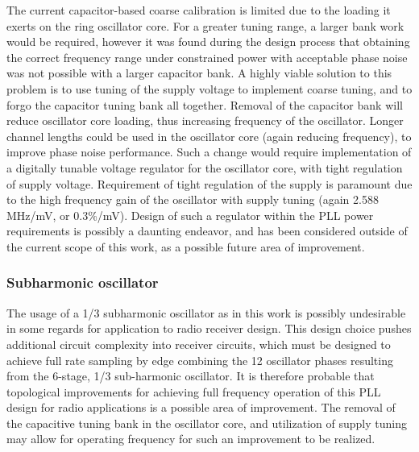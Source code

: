 	The current capacitor-based coarse calibration is limited due to the loading it exerts on the ring oscillator core. For a greater tuning range, a larger bank work would be required, however it was found during the design process that obtaining the correct frequency range under constrained power with acceptable phase noise was not possible with a larger capacitor bank. A highly viable solution to this problem is to use tuning of the supply voltage to implement coarse tuning, and to forgo the capacitor tuning bank all together. Removal of the capacitor bank will reduce oscillator core loading, thus increasing frequency of the oscillator. Longer channel lengths could be used in the oscillator core (again reducing frequency), to improve phase noise performance. Such a change would require implementation of a digitally tunable voltage regulator for the oscillator core, with tight regulation of supply voltage. Requirement of tight regulation of the supply is paramount due to the high frequency gain of the oscillator with supply tuning (again 2.588 MHz/mV, or 0.3\%/mV). Design of such a regulator within the PLL power requirements is possibly a daunting endeavor, and has been considered outside of the current scope of this work, as a possible future area of improvement.

	\subsubsection{Subharmonic oscillator}
		The usage of a 1/3 subharmonic oscillator as in this work is possibly undesirable in some regards for application to radio receiver design. This design choice pushes additional circuit complexity into receiver circuits, which must be designed to achieve full rate sampling by edge combining the 12 oscillator phases resulting from the 6-stage, 1/3 sub-harmonic oscillator. It is therefore probable that topological improvements for achieving full frequency operation of this PLL design for radio applications is a possible area of improvement. The removal of the capacitive tuning bank in the oscillator core, and utilization of supply tuning may allow for operating frequency for such an improvement to be realized.

